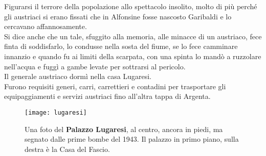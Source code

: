 \indent Figurarsi il terrore della popolazione allo spettacolo insolito, molto di più perché gli austriaci si erano fissati che in Alfonsine fosse nascosto Garibaldi e lo cercavano affannosamente. \\
\indent Si dice anche che un tale, sfuggito alla memoria, alle minacce di un austriaco, fece finta di soddisfarlo, lo condusse nella sosta del fiume, se lo fece camminare innanzio e quando fu ai limiti della scarpata, con una spinta lo mandò a ruzzolare nell'acqua e fuggì a gambe levate per sottrarsi al pericolo.\\
\indent Il generale austriaco dormì nella casa Lugaresi.\\
\indent Furono requisiti generi, carri, carrettieri e contadini per trasportare gli equipaggiamenti e servizi austriaci fino all'altra tappa di Argenta.

 \begin{figure}[htb]
    \centering
    \vspace{-0.1cm}
    \texttt{[image: lugaresi]}
    \caption[Palazzo Lugaresi]{Una foto del \textbf{Palazzo Lugaresi}, al centro, ancora in piedi, ma segnato dalle prime bombe del 1943. Il palazzo in primo piano, sulla destra è la Casa del Fascio.\label{fig:lugaresi}}
    \vspace{-0.7cm}
\end{figure}


